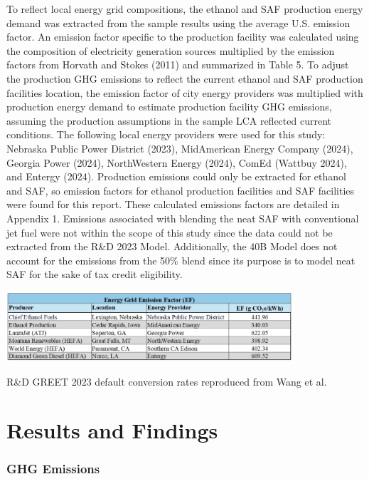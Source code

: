 \documentclass[12pt]{article}
\begin{document}
To reflect local energy grid compositions, the ethanol and SAF production energy demand was extracted from the sample results using the average U.S. emission factor. An emission factor specific to the production facility was calculated using the composition of electricity generation sources multiplied by the emission factors from Horvath and Stokes (2011) and summarized in Table 5. To adjust the production GHG emissions to reflect the current ethanol and SAF production facilities location, the emission factor of city energy providers was multiplied with production energy demand to estimate production facility GHG emissions, assuming the production assumptions in the sample LCA reflected current conditions. The following local energy providers were used for this study: Nebraska Public Power District (2023), MidAmerican Energy Company (2024), Georgia Power (2024), NorthWestern Energy (2024), ComEd (Wattbuy 2024), and Entergy (2024). Production emissions could only be extracted for ethanol and SAF, so emission factors for ethanol production facilities and SAF facilities were found for this report. These calculated emissions factors are detailed in Appendix 1. Emissions associated with blending the neat SAF with conventional jet fuel were not within the scope of this study since the data could not be extracted from the R\&D 2023 Model. Additionally, the 40B Model does not account for the emissions from the 50\% blend since its purpose is to model neat SAF for the sake of tax credit eligibility. 
\begin{table}[H]
\centering
\includegraphics[width=0.8\textwidth]{Figures/factors.png} %
\caption{R\&D GREET 2023 default conversion rates  reproduced from Wang et al.}
\label{fig:factors}
\end{table}

\section{Results and Findings}
\subsubsection{GHG Emissions}
\end{document}
